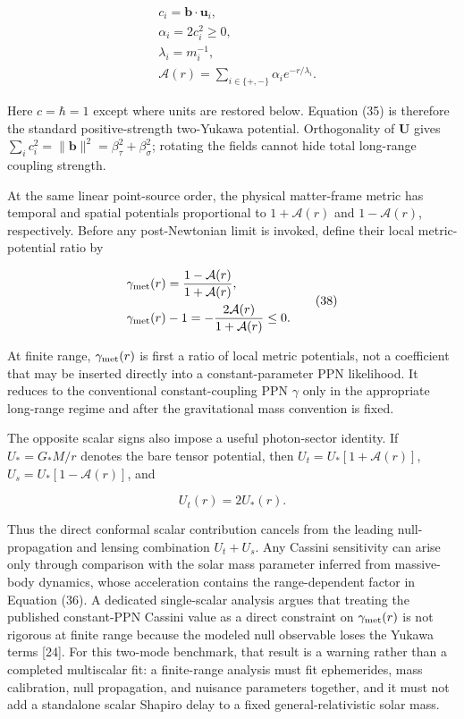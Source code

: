 \documentclass[
  american,
  11pt,
  letterpaper,
]{article}
\begin{document}
\begin{equation}
\begin{aligned}
& c_i=\mathbf b\!\cdot\!\mathbf u_i, \\
& \alpha_i=2c_i^2\geq0, \\
& \lambda_i=m_i^{-1}, \\
& \mathcal A(r)=\sum_{i\in\{+,-\}}\alpha_i e^{-r/\lambda_i} .
\end{aligned}
\tag{37}
\end{equation}

Here \(c=\hbar=1\) except where units are restored below. Equation (35) is therefore the standard positive-strength two-Yukawa potential. Orthogonality of \(\mathbf U\) gives \(\sum_i c_i^2=\|\mathbf b\|^2=\beta_\tau^2+\beta_\sigma^2\); rotating the fields cannot hide total long-range coupling strength.

At the same linear point-source order, the physical matter-frame metric has temporal and spatial potentials proportional to \(1+\mathcal A(r)\) and \(1-\mathcal A(r)\), respectively. Before any post-Newtonian limit is invoked, define their local metric-potential ratio by

\begin{equation}
\begin{aligned}
& \gamma_{\rm met}(r)=\frac{1-\mathcal A(r)}{1+\mathcal A(r)}, \\
& \gamma_{\rm met}(r)-1=-\frac{2\mathcal A(r)}{1+\mathcal A(r)}\leq0 .
\end{aligned}
\tag{38}
\end{equation}

At finite range, \(\gamma_{\rm met}(r)\) is first a ratio of local metric potentials, not a coefficient that may be inserted directly into a constant-parameter PPN likelihood. It reduces to the conventional constant-coupling PPN \(\gamma\) only in the appropriate long-range regime and after the gravitational mass convention is fixed.

The opposite scalar signs also impose a useful photon-sector identity. If \(U_*=G_*M/r\) denotes the bare tensor potential, then \(U_t=U_*[1+\mathcal A(r)]\), \(U_s=U_*[1-\mathcal A(r)]\), and

\begin{equation}
[1+\gamma_{\rm met}(r)]U_t(r)=2U_*(r).
\tag{39}
\end{equation}

Thus the direct conformal scalar contribution cancels from the leading null-propagation and lensing combination \(U_t+U_s\). Any Cassini sensitivity can arise only through comparison with the solar mass parameter inferred from massive-body dynamics, whose acceleration contains the range-dependent factor in Equation (36). A dedicated single-scalar analysis argues that treating the published constant-PPN Cassini value as a direct constraint on \(\gamma_{\rm met}(r)\) is not rigorous at finite range because the modeled null observable loses the Yukawa terms {[}24{]}. For this two-mode benchmark, that result is a warning rather than a completed multiscalar fit: a finite-range analysis must fit ephemerides, mass calibration, null propagation, and nuisance parameters together, and it must not add a standalone scalar Shapiro delay to a fixed general-relativistic solar mass.
\end{document}
